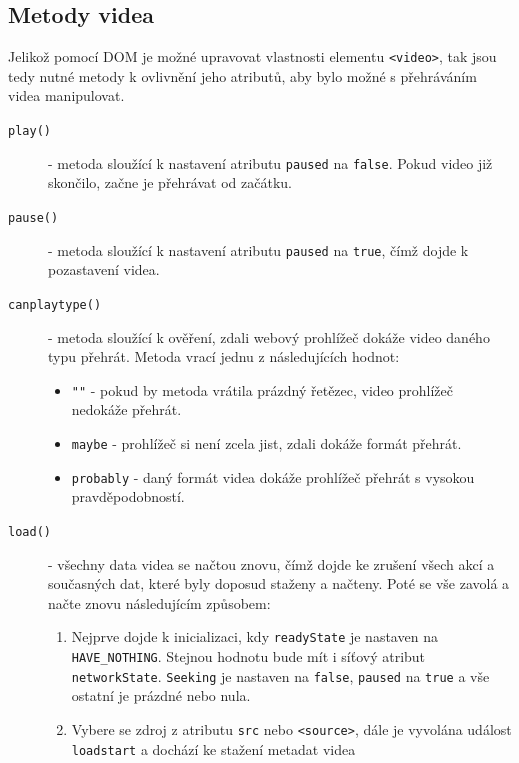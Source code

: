 \newpage

\subsection{Metody videa}
Jelikož pomocí DOM je možné upravovat vlastnosti elementu \texttt{<video>}, tak jsou tedy nutné metody k ovlivnění jeho atributů, aby bylo možné s přehráváním videa manipulovat.

\begin{description}
	\item[\texttt{play()}] - metoda sloužící k nastavení atributu \texttt{paused} na \texttt{false}. Pokud video již skončilo, začne je přehrávat od začátku.
	
	\item[\texttt{pause()}] - metoda sloužící k nastavení atributu \texttt{paused} na \texttt{true}, čímž dojde k pozastavení videa.
	
	\item[\texttt{canplaytype()}] - metoda sloužící k ověření, zdali webový prohlížeč dokáže video daného typu přehrát. Metoda vrací jednu z následujících hodnot:
	 	\begin{itemize}		
			\item \texttt{""} - pokud by metoda vrátila prázdný řetězec, video prohlížeč nedokáže přehrát.
			\item \texttt{maybe} - prohlížeč si není zcela jist, zdali dokáže formát přehrát.
			\item \texttt{probably} - daný formát videa dokáže prohlížeč přehrát s vysokou pravděpodobností.
		\end{itemize}
	\item[\texttt{load()}] - všechny data videa se načtou znovu, čímž dojde ke zrušení všech akcí a současných dat, které byly doposud staženy a načteny. Poté se vše zavolá a načte znovu následujícím způsobem:
	 	\begin{enumerate}
			\item Nejprve dojde k inicializaci, kdy \texttt{readyState} je nastaven na \texttt{HAVE\_NOTHING}. Stejnou hodnotu bude mít i síťový atribut \texttt{networkState}. \texttt{Seeking} je nastaven na \texttt{false}, \texttt{paused}  na \texttt{true} a vše ostatní je prázdné nebo nula.	
			
			\item Vybere se zdroj z atributu \texttt{src} nebo \texttt{<source>}, dále je vyvolána událost \texttt{loadstart} a dochází ke stažení metadat videa
			

\end{enumerate}
\end{description}
